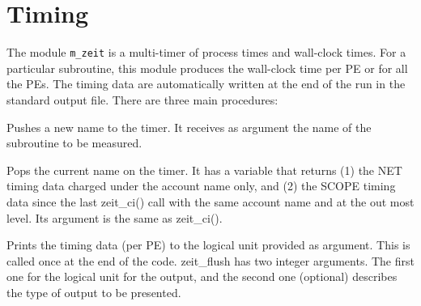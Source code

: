 %  
%  
%  
\section{Timing}
The module {\tt m\_zeit} is a multi-timer of process times and wall-clock 
times. For a particular subroutine, this module produces the wall-clock 
time per PE or for all the PEs. The timing data are automatically written 
at the end of the run in the standard output file.
There are three main procedures:

 Pushes a new name to the timer. 
It receives as argument the name of the subroutine to be measured.

 Pops the current name on the timer. It has a
variable that returns (1) the NET timing data charged under the account 
name only, and (2) the SCOPE timing data since the last zeit\_ci() call with 
the same account name and at the out most level.
Its argument is the same as zeit\_ci().

 Prints the timing data (per PE) to the logical 
unit provided as argument. This is called once at the end of the code.
zeit\_flush has two integer arguments. The first one for the logical 
unit for the output, and the second one (optional) describes the type of
output to be presented.

